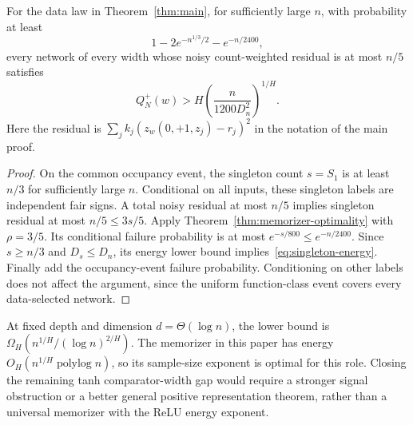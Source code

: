 \begin{corollary}
\label{cor:singleton-energy}
For the data law in Theorem~\ref{thm:main}, for sufficiently large $n$, with probability at least
\[
 1-2e^{-n^{1/3}/2}-e^{-n/2400},
\]
every network of every width whose noisy count-weighted residual is at most $n/5$ satisfies
\begin{equation}
 Q_N^+(w)>H\left(\frac{n}{1200D_n^2}\right)^{1/H}.
 \label{eq:singleton-energy}
\end{equation}
Here the residual is $\sum_j k_j(z_w(0,+1,z_j)-r_j)^2$ in the notation of the main proof.
\end{corollary}
\begin{proof}
On the common occupancy event, the singleton count $s=S_1$ is at least $n/3$ for sufficiently large $n$. Conditional on all inputs, these singleton labels are independent fair signs. A total noisy residual at most $n/5$ implies singleton residual at most $n/5\le3s/5$. Apply Theorem~\ref{thm:memorizer-optimality} with $\rho=3/5$. Its conditional failure probability is at most $e^{-s/800}\le e^{-n/2400}$. Since $s\ge n/3$ and $D_s\le D_n$, its energy lower bound implies~\eqref{eq:singleton-energy}. Finally add the occupancy-event failure probability. Conditioning on other labels does not affect the argument, since the uniform function-class event covers every data-selected network.
\end{proof}

At fixed depth and dimension $d=\Theta(\log n)$, the lower bound is
$\Omega_H(n^{1/H}/(\log n)^{2/H})$. The memorizer in this paper has energy $O_H(n^{1/H}\operatorname{polylog}n)$, so its sample-size exponent is optimal for this role. Closing the remaining tanh comparator-width gap would require a stronger signal obstruction or a better general positive representation theorem, rather than a universal memorizer with the ReLU energy exponent.
